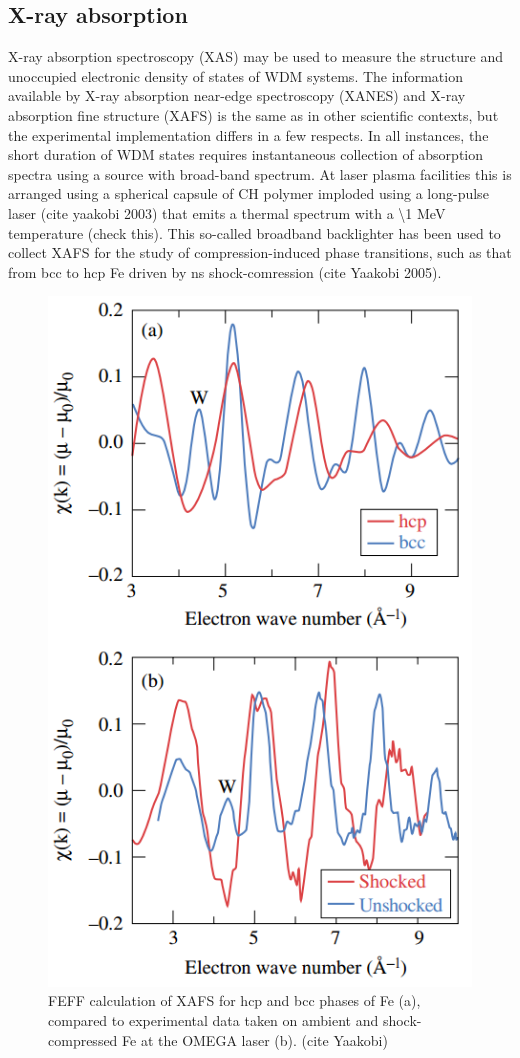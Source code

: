 \documentclass [11pt, proquest, article] {uwthesis}[2016/11/22]
\begin{document}
\subsection{X-ray absorption}
X-ray absorption spectroscopy (XAS) may be used to measure the structure and unoccupied electronic density of states of WDM systems. The information available by X-ray absorption near-edge spectroscopy (XANES) and X-ray absorption fine structure (XAFS) is the same as in other scientific contexts, but the experimental implementation differs in a few respects. In all instances, the short duration of WDM states requires instantaneous collection of absorption spectra using a source with broad-band spectrum. At laser plasma facilities this is arranged using a spherical capsule of CH polymer imploded using a long-pulse laser (cite yaakobi 2003) that emits a thermal spectrum with a \textbackslash 1 MeV temperature (check this). This so-called broadband backlighter has been used to collect XAFS for the study of compression-induced phase transitions, such as that from bcc to hcp Fe driven by ns shock-comression (cite Yaakobi 2005).

\begin{figure}[h] \label{fig:xafs}
\caption{FEFF calculation of XAFS for hcp and bcc phases of Fe (a), compared to experimental data taken on ambient and shock-compressed Fe at the OMEGA laser (b). (cite Yaakobi)}
\centering
\includegraphics[scale=0.6]{../Figures/yaakobi_shock_xafs.png}
\end{figure}
\end{document}
